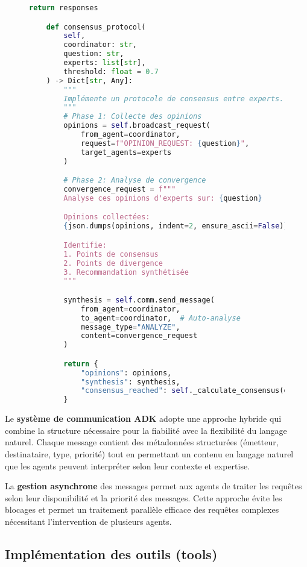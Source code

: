 \begin{figure}[H]
\begin{lstlisting}[language=Python, caption=Architecture de communication inter-agents]
        return responses

    def consensus_protocol(
        self,
        coordinator: str,
        question: str,
        experts: list[str],
        threshold: float = 0.7
    ) -> Dict[str, Any]:
        """
        Implémente un protocole de consensus entre experts.
        """
        # Phase 1: Collecte des opinions
        opinions = self.broadcast_request(
            from_agent=coordinator,
            request=f"OPINION_REQUEST: {question}",
            target_agents=experts
        )

        # Phase 2: Analyse de convergence
        convergence_request = f"""
        Analyse ces opinions d'experts sur: {question}

        Opinions collectées:
        {json.dumps(opinions, indent=2, ensure_ascii=False)}

        Identifie:
        1. Points de consensus
        2. Points de divergence
        3. Recommandation synthétisée
        """

        synthesis = self.comm.send_message(
            from_agent=coordinator,
            to_agent=coordinator,  # Auto-analyse
            message_type="ANALYZE",
            content=convergence_request
        )

        return {
            "opinions": opinions,
            "synthesis": synthesis,
            "consensus_reached": self._calculate_consensus(opinions) > threshold
        }
\end{lstlisting}
\end{figure}

Le \textbf{système de communication ADK} adopte une approche hybride qui combine la structure nécessaire pour la fiabilité avec la flexibilité du langage naturel. Chaque message contient des métadonnées structurées (émetteur, destinataire, type, priorité) tout en permettant un contenu en langage naturel que les agents peuvent interpréter selon leur contexte et expertise.

La \textbf{gestion asynchrone} des messages permet aux agents de traiter les requêtes selon leur disponibilité et la priorité des messages. Cette approche évite les blocages et permet un traitement parallèle efficace des requêtes complexes nécessitant l'intervention de plusieurs agents.

\subsection{Implémentation des outils (tools)}

